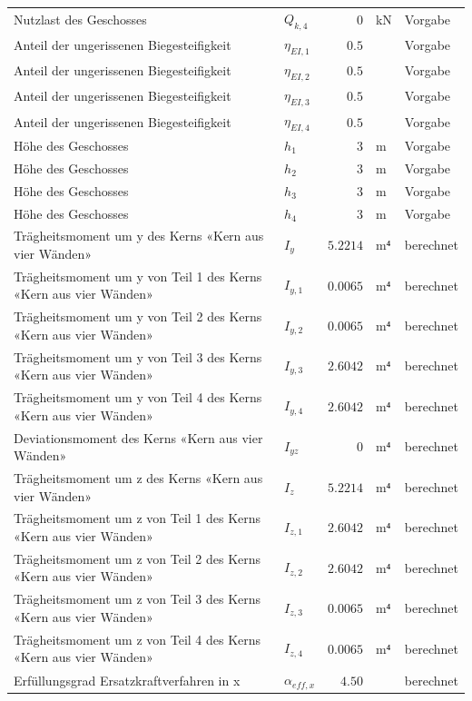 \documentclass[11pt,a4paper]{article}
\begin{document}
\begin{xltabular}{\linewidth}{>{\raggedright\arraybackslash}Xlrll}
Nutzlast des Geschosses & $Q_{k,4}$ & $0$ & kN & Vorgabe \\
Anteil der ungerissenen Biegesteifigkeit & $\eta_{EI,1}$ & $0.5$ &  & Vorgabe \\
Anteil der ungerissenen Biegesteifigkeit & $\eta_{EI,2}$ & $0.5$ &  & Vorgabe \\
Anteil der ungerissenen Biegesteifigkeit & $\eta_{EI,3}$ & $0.5$ &  & Vorgabe \\
Anteil der ungerissenen Biegesteifigkeit & $\eta_{EI,4}$ & $0.5$ &  & Vorgabe \\
Höhe des Geschosses & $h_{1}$ & $3$ & m & Vorgabe \\
Höhe des Geschosses & $h_{2}$ & $3$ & m & Vorgabe \\
Höhe des Geschosses & $h_{3}$ & $3$ & m & Vorgabe \\
Höhe des Geschosses & $h_{4}$ & $3$ & m & Vorgabe \\
Trägheitsmoment um y des Kerns «Kern aus vier Wänden» & $I_y$ & $5.2214$ & m⁴ & berechnet \\
Trägheitsmoment um y von Teil 1 des Kerns «Kern aus vier Wänden» & $I_{y,1}$ & $0.0065$ & m⁴ & berechnet \\
Trägheitsmoment um y von Teil 2 des Kerns «Kern aus vier Wänden» & $I_{y,2}$ & $0.0065$ & m⁴ & berechnet \\
Trägheitsmoment um y von Teil 3 des Kerns «Kern aus vier Wänden» & $I_{y,3}$ & $2.6042$ & m⁴ & berechnet \\
Trägheitsmoment um y von Teil 4 des Kerns «Kern aus vier Wänden» & $I_{y,4}$ & $2.6042$ & m⁴ & berechnet \\
Deviationsmoment des Kerns «Kern aus vier Wänden» & $I_{yz}$ & $0$ & m⁴ & berechnet \\
Trägheitsmoment um z des Kerns «Kern aus vier Wänden» & $I_z$ & $5.2214$ & m⁴ & berechnet \\
Trägheitsmoment um z von Teil 1 des Kerns «Kern aus vier Wänden» & $I_{z,1}$ & $2.6042$ & m⁴ & berechnet \\
Trägheitsmoment um z von Teil 2 des Kerns «Kern aus vier Wänden» & $I_{z,2}$ & $2.6042$ & m⁴ & berechnet \\
Trägheitsmoment um z von Teil 3 des Kerns «Kern aus vier Wänden» & $I_{z,3}$ & $0.0065$ & m⁴ & berechnet \\
Trägheitsmoment um z von Teil 4 des Kerns «Kern aus vier Wänden» & $I_{z,4}$ & $0.0065$ & m⁴ & berechnet \\
Erfüllungsgrad Ersatzkraftverfahren in x & $\alpha_{eff,x}$ & $4.50$ &  & berechnet \\

\end{xltabular}
\end{document}
